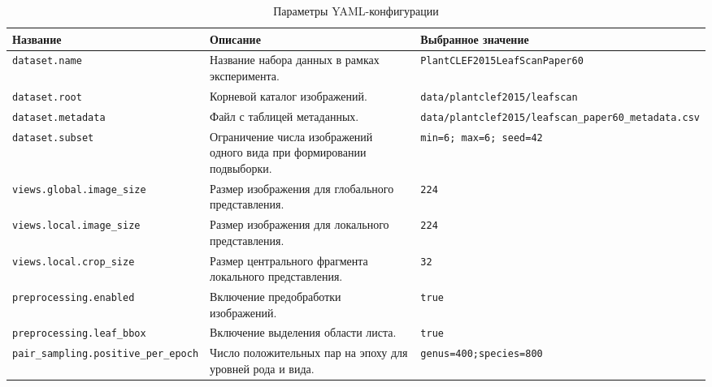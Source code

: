 \begin{table}[!htbp]
	\centering
	\caption{Параметры YAML-конфигурации}
	\label{table:yaml-config}
	\footnotesize
	\renewcommand{\arraystretch}{1.2}
	\begin{tabularx}{\linewidth}{|p{4.5cm}|X|p{4.6cm}|}
		\hline
		\textbf{Название} & \textbf{Описание} & \textbf{Выбранное значение} \\
		\hline
		\texttt{dataset.name} & Название набора данных в рамках эксперимента. & \texttt{PlantCLEF2015}\newline\texttt{LeafScanPaper60} \\
		\hline
		\texttt{dataset.root} & Корневой каталог изображений. & \texttt{data/plantclef2015/}\newline\texttt{leafscan} \\
		\hline
		\texttt{dataset.metadata} & Файл с таблицей метаданных. & \texttt{data/plantclef2015/}\newline\texttt{leafscan\_paper60\_}\newline\texttt{metadata.csv} \\
		\hline
		\texttt{dataset.subset} & Ограничение числа изображений одного вида при формировании подвыборки. & \texttt{min=6; max=6; seed=42} \\
		\hline
		\texttt{views.global.}\newline\texttt{image\_size} & Размер изображения для глобального представления. & \texttt{224} \\
		\hline
		\texttt{views.local.}\newline\texttt{image\_size} & Размер изображения для локального представления. & \texttt{224} \\
		\hline
		\texttt{views.local.}\newline\texttt{crop\_size} & Размер центрального фрагмента локального представления. & \texttt{32} \\
		\hline
		\texttt{preprocessing.}\newline\texttt{enabled} & Включение предобработки изображений. & \texttt{true} \\
		\hline
		\texttt{preprocessing.}\newline\texttt{leaf\_bbox} & Включение выделения области листа. & \texttt{true} \\
		\hline
		\texttt{pair\_sampling.}\newline\texttt{positive\_per\_epoch} & Число положительных пар на эпоху для уровней рода и вида. & \texttt{genus=400;}\newline\texttt{species=800} \\

\end{tabularx}
\end{table}
